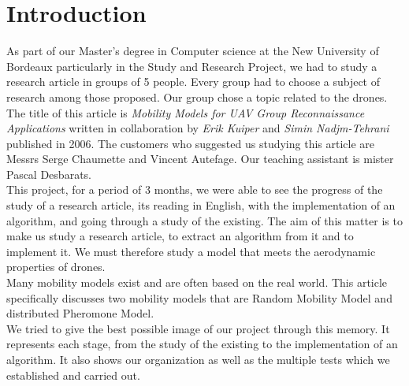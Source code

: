 \chapter*{Introduction}

As part of our Master's degree in Computer science at the New University of Bordeaux particularly in the Study and Research Project, we had to study a research article in groups of 5 people. Every group had to choose a subject of research among those proposed. Our group chose a topic related to the drones. The title of this article is \textit{Mobility Models for UAV Group Reconnaissance Applications} written in collaboration by \textit{Erik Kuiper} and \textit{Simin Nadjm-Tehrani} published in 2006. The customers who suggested us studying this article are Messrs Serge Chaumette and Vincent Autefage. Our teaching assistant is mister Pascal Desbarats.\\

This project, for a period of 3 months, we were able to see the progress of the study of a research article, its reading in English, with the implementation of an algorithm, and going through a study of the existing.
The aim of this matter is to make us study a research article, to extract an algorithm from it and to implement it.
We must therefore study a model that meets the aerodynamic properties of drones.\\

Many mobility models exist and are often based on the real world.
This article specifically discusses two mobility models that are Random Mobility Model and distributed Pheromone Model.\\

We tried to give the best possible image of our project through this memory. It represents each stage, from the study of the existing to the implementation of an algorithm. It also shows our organization as well as the multiple tests which we established and carried out. 
